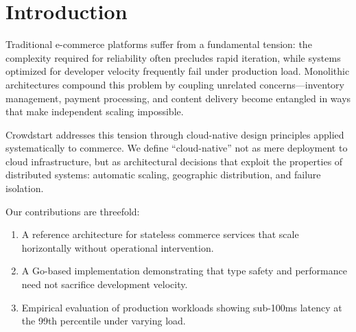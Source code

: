 \section{Introduction}


Traditional e-commerce platforms suffer from a fundamental tension: the complexity required for reliability often precludes rapid iteration, while systems optimized for developer velocity frequently fail under production load. Monolithic architectures compound this problem by coupling unrelated concerns—inventory management, payment processing, and content delivery become entangled in ways that make independent scaling impossible.

Crowdstart addresses this tension through cloud-native design principles applied systematically to commerce. We define ``cloud-native'' not as mere deployment to cloud infrastructure, but as architectural decisions that exploit the properties of distributed systems: automatic scaling, geographic distribution, and failure isolation.

Our contributions are threefold:
\begin{enumerate}
\item A reference architecture for stateless commerce services that scale horizontally without operational intervention.
\item A Go-based implementation demonstrating that type safety and performance need not sacrifice development velocity.
\item Empirical evaluation of production workloads showing sub-100ms latency at the 99th percentile under varying load.
\end{enumerate}

